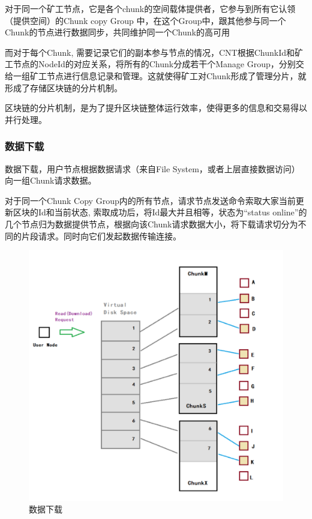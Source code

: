 \documentclass[a4paper,12pt]{article}
\begin{document}
对于同一个矿工节点，它是各个chunk的空间载体提供者，它参与到所有它认领（提供空间）的Chunk copy Group 中，在这个Group中，跟其他参与同一个Chunk的节点进行数据同步，共同维护同一个Chunk的高可用

而对于每个Chunk, 需要记录它们的副本参与节点的情况，CNT根据ChunkId和矿工节点的NodeId的对应关系，将所有的Chunk分成若干个Manage Group，分别交给一组矿工节点进行信息记录和管理。这就使得矿工对Chunk形成了管理分片，就形成了存储区块链的分片机制。

区块链的分片机制，是为了提升区块链整体运行效率，使得更多的信息和交易得以并行处理。


\subsubsection{数据下载}

数据下载，用户节点根据数据请求（来自File System，或者上层直接数据访问）向一组Chunk请求数据。

对于同一个Chunk Copy Group内的所有节点，请求节点发送命令索取大家当前更新区块的Id和当前状态, 索取成功后，将Id最大并且相等，状态为“status online”的几个节点归为数据提供节点，根据向该Chunk请求数据大小，将下载请求切分为不同的片段请求。同时向它们发起数据传输连接。


\begin {figure} [htbp]
\centering \includegraphics [width = 5in] {pic_cn/data_download.png}
\caption {数据下载} \label {fig: d6}
\end {figure}
\end{document}
